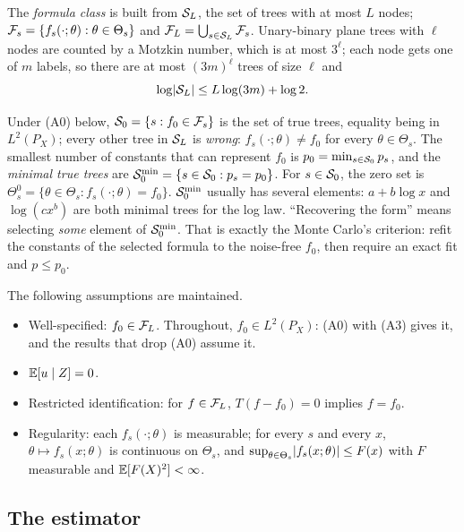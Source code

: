 The \emph{formula class} is built from $\mathcal{S}_L$, the set of trees with at most $L$ nodes; $\mathcal{F}_s = \{f_s(\cdot;\theta) : \theta \in \Theta_s\}$ and $\mathcal{F}_L = \bigcup_{s \in \mathcal{S}_L}\mathcal{F}_s$. Unary-binary plane trees with $\ell$ nodes are counted by a Motzkin number, which is at most $3^{\ell}$; each node gets one of $m$ labels, so there are at most $(3m)^{\ell}$ trees of size $\ell$ and
\begin{equation}
\log\lvert \mathcal{S}_L\rvert \le L\log(3m) + \log 2.
\label{eq:treecount}
\end{equation}

Under (A0) below, $\mathcal{S}_0 = \{s : f_0 \in \mathcal{F}_s\}$ is the set of true trees, equality being in $L^2(P_X)$; every other tree in $\mathcal{S}_L$ is \emph{wrong}: $f_s(\cdot;\theta) \ne f_0$ for every $\theta \in \Theta_s$. The smallest number of constants that can represent $f_0$ is $p_0 = \min_{s \in \mathcal{S}_0}p_s$, and the \emph{minimal true trees} are $\mathcal{S}_0^{\min} = \{s \in \mathcal{S}_0 : p_s = p_0\}$. For $s \in \mathcal{S}_0$, the zero set is $\Theta_s^0 = \{\theta \in \Theta_s : f_s(\cdot;\theta) = f_0\}$. $\mathcal{S}_0^{\min}$ usually has several elements: $a + b\log x$ and $\log(cx^{b})$ are both minimal trees for the log law. ``Recovering the form'' means selecting \emph{some} element of $\mathcal{S}_0^{\min}$. That is exactly the Monte Carlo's criterion: refit the constants of the selected formula to the noise-free $f_0$, then require an exact fit and $p \le p_0$.

The following assumptions are maintained.
\begin{itemize}
\item[(A0)] Well-specified: $f_0 \in \mathcal{F}_L$. Throughout, $f_0 \in L^2(P_X)$: (A0) with (A3) gives it, and the results that drop (A0) assume it.
\item[(A1)] $\mathbb{E}[u \mid Z] = 0$.
\item[(A2)] Restricted identification: for $f \in \mathcal{F}_L$, $T(f - f_0) = 0$ implies $f = f_0$.
\item[(A3)] Regularity: each $f_s(\cdot;\theta)$ is measurable; for every $s$ and every $x$, $\theta \mapsto f_s(x;\theta)$ is continuous on $\Theta_s$, and $\sup_{\theta \in \Theta_s}\lvert f_s(x;\theta)\rvert \le F(x)$ with $F$ measurable and $\mathbb{E}[F(X)^2] < \infty$.
\end{itemize}

\subsection{The estimator}
\label{sec:estimator}

